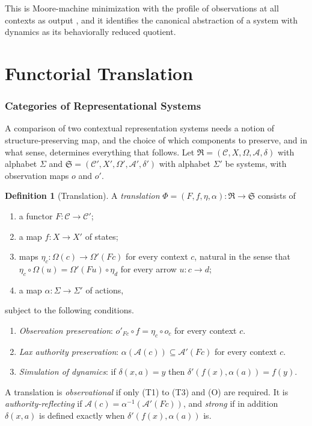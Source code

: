 \documentclass[11pt]{article}
\theoremstyle{definition}
\newtheorem{definition}[theorem]{Definition}
\theoremstyle{remark}
\newcommand{\cC}{\mathcal C}
\newcommand{\cA}{\mathcal A}
\newcommand{\fR}{\mathfrak R}
\newcommand{\fS}{\mathfrak S}
\begin{document}
This is Moore-machine minimization with the profile of observations at all contexts as output \cite{moore,sangiorgi}, and it identifies the canonical abstraction of a system with dynamics as its behaviorally reduced quotient.
\part{Functorial Translation}

\section{Categories of Representational Systems}

A comparison of two contextual representation systems needs a notion of structure-preserving map, and the choice of which components to preserve, and in what sense, determines everything that follows. Let $\fR=(\cC,X,\Omega,\cA,\delta)$ with alphabet $\Sigma$ and $\fS=(\cC',X',\Omega',\cA',\delta')$ with alphabet $\Sigma'$ be systems, with observation maps $o$ and $o'$.

\begin{definition}[Translation]\label{def:translation}
A \emph{translation} $\Phi=(F,f,\eta,\alpha):\fR\to\fS$ consists of
\begin{enumerate}[label=(T\arabic*)]
\item a functor $F:\cC\to\cC'$;
\item a map $f:X\to X'$ of states;
\item maps $\eta_c:\Omega(c)\to\Omega'(Fc)$ for every context $c$, natural in the sense that $\eta_c\circ\Omega(u)=\Omega'(Fu)\circ\eta_d$ for every arrow $u:c\to d$;
\item a map $\alpha:\Sigma\to\Sigma'$ of actions,
\end{enumerate}
subject to the following conditions.
\begin{enumerate}[label=(\Alph*)]
\item[(O)] \emph{Observation preservation}: $o'_{Fc}\circ f=\eta_c\circ o_c$ for every context $c$.
\item[(A)] \emph{Lax authority preservation}: $\alpha(\cA(c))\subseteq\cA'(Fc)$ for every context $c$.
\item[(D)] \emph{Simulation of dynamics}: if $\delta(x,a)=y$ then $\delta'(f(x),\alpha(a))=f(y)$.
\end{enumerate}
A translation is \emph{observational} if only (T1) to (T3) and (O) are required. It is \emph{authority-reflecting} if $\cA(c)=\alpha^{-1}(\cA'(Fc))$, and \emph{strong} if in addition $\delta(x,a)$ is defined exactly when $\delta'(f(x),\alpha(a))$ is.
\end{definition}
\end{document}

